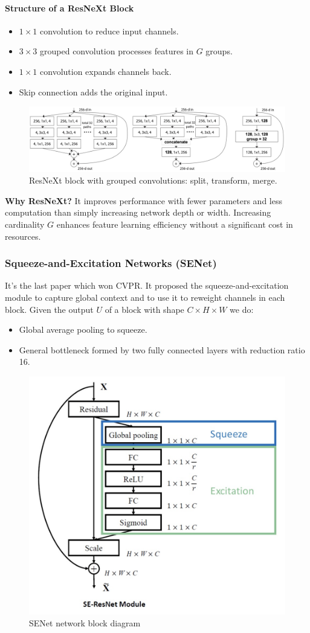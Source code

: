 \paragraph{Structure of a ResNeXt Block}
\begin{itemize}
  \item $1 \times 1$ convolution to reduce input channels.
  \item $3 \times 3$ grouped convolution processes features in $G$ groups.
  \item $1 \times 1$ convolution expands channels back.
  \item Skip connection adds the original input.
\end{itemize}

\begin{figure}[htbp]
  \centering
  \includegraphics[width=0.85\linewidth]{./img/resnext_grouped.jpg}
  \caption{ResNeXt block with grouped convolutions: split, transform, merge.}
\end{figure}

\textbf{Why ResNeXt?}  
It improves performance with fewer parameters and less computation than simply increasing network depth or width. Increasing cardinality $G$ enhances feature learning efficiency without a significant cost in resources.

\subsubsection{Squeeze-and-Excitation Networks (SENet)}
It's the last paper which won CVPR.
It proposed the squeeze-and-excitation module to capture global context and to use it to reweight channels in each block.
Given the output $U$ of a block with shape $C \times H \times W$ we do:
\begin{itemize}
  \item Global average pooling to squeeze.
  \item General bottleneck formed by two fully connected layers with reduction ratio 16.
\end{itemize}

\begin{figure}[htbp]
  \centering
  \includegraphics[width=0.5\linewidth]{./img/senet.jpg}
  \caption{SENet network block diagram}
\end{figure}

